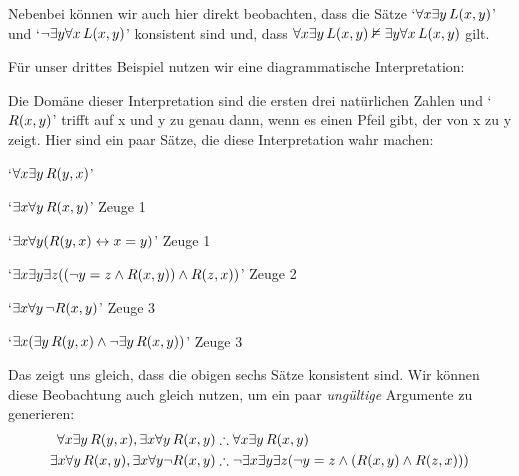 Nebenbei können wir auch hier direkt beobachten, dass die Sätze `$\forall x \exists y\, \mathord{L}(x,y)$' und `$\neg\exists y \forall x\, \mathord{L}(x,y)$' konsistent sind und, dass $\forall x \exists y\, \mathord{L}(x,y) \nvDash \exists y \forall x\, \mathord{L}(x,y)$ gilt. 

Für unser drittes Beispiel nutzen wir eine diagrammatische Interpretation:
\begin{center}
\end{center}
Die Domäne dieser Interpretation sind die ersten drei natürlichen Zahlen und `$\mathord{R}(x,y)$' trifft auf x und y zu genau dann, wenn es einen Pfeil gibt, der von x zu y zeigt. Hier sind ein paar Sätze, die diese Interpretation wahr machen:
\begin{ebullet}
	\item `$\forall x \exists y\, \mathord{R}(y,x)$' 
	\item `$\exists x \forall y\, \mathord{R}(x,y)$' \hfill Zeuge 1
	\item `$\exists x \forall y (\mathord{R}(y,x) \leftrightarrow x = y)$' \hfill Zeuge 1
	\item `$\exists x \exists y \exists z ((\neg y = z \wedge \mathord{R}(x,y)) \wedge \mathord{R}(z,x))$' \hfill Zeuge 2
	\item `$\exists x \forall y\, \neg \mathord{R}(x,y)$' \hfill Zeuge 3
	\item `$\exists x (\exists y\, \mathord{R}(y,x) \wedge \neg \exists y\, \mathord{R}(x,y))$' \hfill Zeuge 3
\end{ebullet}
Das zeigt uns gleich, dass die obigen sechs Sätze konsistent sind. Wir können diese Beobachtung auch gleich nutzen, um ein paar \emph{ungültige} Argumente zu generieren:
\begin{align*}
	\forall x \exists y\, \atom{R}{y,x}, \exists x \forall y\, \atom{R}{x,y}  &\therefore  \forall x \exists y\, \atom{R}{x,y}\\
	\exists x \forall y\, \atom{R}{x,y}, \exists x \forall y \enot \atom{R}{x,y} & \therefore \enot \exists x \exists y \exists z (\enot y = z \eand (\atom{R}{x,y} \eand \atom{R}{z,x}))
\end{align*}

